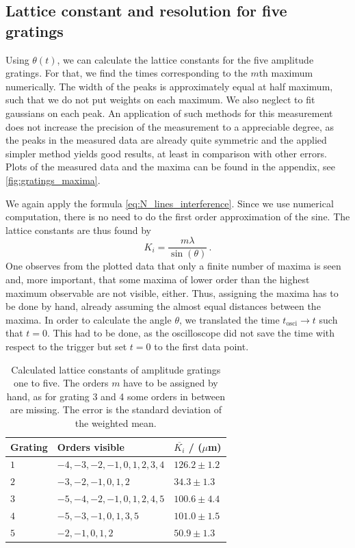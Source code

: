 \subsection{Lattice constant and resolution for five gratings}
Using $\theta(t)$, we can calculate the lattice constants for the five amplitude gratings. 
For that, we find the times corresponding to the $m$th maximum numerically. The width 
of the peaks is approximately equal at half maximum, such that we do not put weights 
on each maximum. We also neglect to fit gaussians on each peak. An application of such methods 
for this measurement does not increase the precision of the measurement to a appreciable degree, 
as the peaks in the measured data are already quite symmetric and the applied simpler method yields 
good results, at least in comparison with other errors. 
Plots of the measured data and the maxima can be found in the appendix, see 
\ref{fig:gratings_maxima}. 

We again apply the formula \ref{eq:N_lines_interference}. Since we use numerical computation, 
there is no need to do the first order approximation of the sine. The lattice constants are thus 
found by
\begin{equation}
    K_i = \frac{m\lambda}{\sin(\theta)}\, .
\end{equation}
One observes from the plotted data that only a finite number of maxima is seen and, more important, 
that some maxima of lower order than the highest maximum observable are not visible, either. 
Thus, assigning the maxima has to be done by hand, already assuming the almost equal distances between the 
maxima. In order to calculate the angle $\theta$, we translated the time $t_\mathrm{osci} \rightarrow t$ 
such that $t = 0$. 
This had to be done, as the oscilloscope did not save the time with respect to the trigger 
but set $t = 0$ to the first data point. 

\begin{table}[htdp]
    \centering
	\begin{tabular}{|p{3.82cm}|p{6.18cm}|p{3.82cm}|}
		\hline
		\rowcolor{tabcolor}
		Grating & Orders visible & $\overline{K_i}$ / ($\mu$m)  \\ \hline
		$1$  & $-4, -3, -2, -1, 0, 1, 2, 3, 4$  & $ 126.2 \pm 1.2$ \\
		$2$  & $-3, -2, -1, 0, 1, 2$            & $ 34.3 \pm 1.3$ \\
		$3$  & $-5, -4, -2, -1, 0, 1, 2, 4, 5$  & $ 100.6 \pm 4.4$ \\
		$4$  & $-5, -3, -1, 0, 1, 3, 5$         & $ 101.0 \pm 1.5$ \\
		$5$  & $-2, -1, 0, 1, 2$                & $ 50.9 \pm 1.3$ \\
		\hline
	\end{tabular}
    \caption{
        Calculated lattice constants of amplitude gratings one to five. 
        The orders $m$ have to be assigned by hand, as for grating 3 and 4 some 
        orders in between are missing. The error is the standard deviation of 
        the weighted mean.
        }
    \label{tab:gratings_K}
\end{table}

